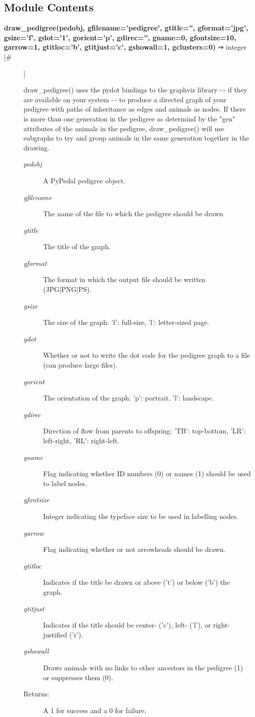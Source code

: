 \subsection*{Module Contents}
\begin{description}
\item[\textbf{draw\_pedigree(pedobj, gfilename='pedigree', gtitle='', gformat='jpg', gsize='f', gdot='1', gorient='p', gdirec='', gname=0, gfontsize=10, garrow=1, gtitloc='b', gtitjust='c', gshowall=1, gclusters=0)} ⇒ integer [\#]
]
\par draw\_pedigree() uses the pydot bindings to the graphviz library -$\,$- if they
are available on your system -$\,$- to produce a directed graph of your pedigree
with paths of inheritance as edges and animals as nodes.  If there is more than
one generation in the pedigree as determind by the "gen" attributes of the animals
in the pedigree, draw\_pedigree() will use subgraphs to try and group animals in the
same generation together in the drawing.
\begin{description}
\item[\textit{pedobj}
]
A PyPedal pedigree object.
\item[\textit{gfilename}
]
The name of the file to which the pedigree should be drawn
\item[\textit{gtitle}
]
The title of the graph.
\item[\textit{gformat}
]
The format in which the output file should be written  (JPG|PNG|PS).
\item[\textit{gsize}
]
The size of the graph: 'f': full-size, 'l': letter-sized page.
\item[\textit{gdot}
]
Whether or not to write the dot code for the pedigree graph to a file (can produce large files).
\item[\textit{gorient}
]
The orientation of the graph: 'p': portrait, 'l': landscape.
\item[\textit{gdirec}
]
Direction of flow from parents to offspring: 'TB': top-bottom, 'LR': left-right, 'RL': right-left.
\item[\textit{gname}
]
Flag indicating whether ID numbers (0) or names (1) should be used to label nodes.
\item[\textit{gfontsize}
]
Integer indicating the typeface size to be used in labelling nodes.
\item[\textit{garrow}
]
Flag indicating whether or not arrowheads should be drawn.
\item[\textit{gtitloc}
]
Indicates if the title be drawn or above ('t') or below ('b') the graph.
\item[\textit{gtitjust}
]
Indicates if the title should be center- ('c'), left- ('l'), or right-justified ('r').
\item[\textit{gshowall}
]
Draws animals with no links to other ancestors in the pedigree (1) or suppresses them (0).
\item[Returns:
]
A 1 for success and a 0 for failure.
\end{description}\\


\end{description}
